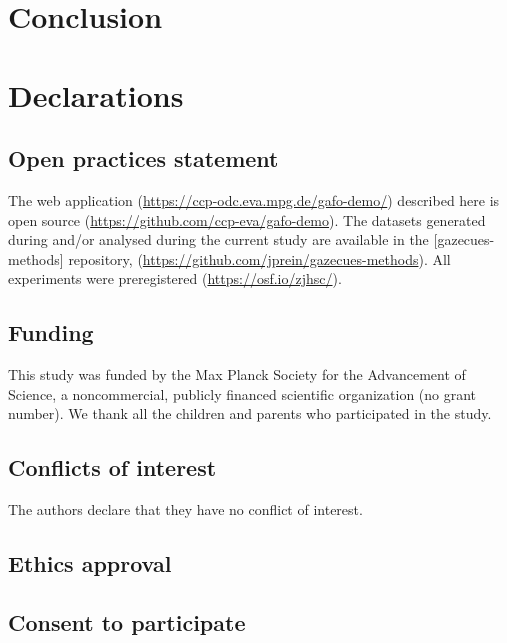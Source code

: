 \documentclass[
  man,floatsintext]{apa6}
\begin{document}
\hypertarget{conclusion}{%
\section{Conclusion}\label{conclusion}}

\hypertarget{declarations}{%
\section{Declarations}\label{declarations}}

\hypertarget{open-practices-statement}{%
\subsection{Open practices statement}\label{open-practices-statement}}

The web application (\url{https://ccp-odc.eva.mpg.de/gafo-demo/}) described here is open source (\url{https://github.com/ccp-eva/gafo-demo}).
The datasets generated during and/or analysed during the current study are available in the {[}gazecues-methods{]} repository, (\url{https://github.com/jprein/gazecues-methods}). All experiments were preregistered (\url{https://osf.io/zjhsc/}).

\hypertarget{funding}{%
\subsection{Funding}\label{funding}}

This study was funded by the Max Planck Society for the Advancement of Science, a noncommercial, publicly financed scientific organization (no grant number). We thank all the children and parents who participated in the study.

\hypertarget{conflicts-of-interest}{%
\subsection{Conflicts of interest}\label{conflicts-of-interest}}

The authors declare that they have no conflict of interest.

\hypertarget{ethics-approval}{%
\subsection{Ethics approval}\label{ethics-approval}}

\hypertarget{consent-to-participate}{%
\subsection{Consent to participate}\label{consent-to-participate}}
\end{document}
